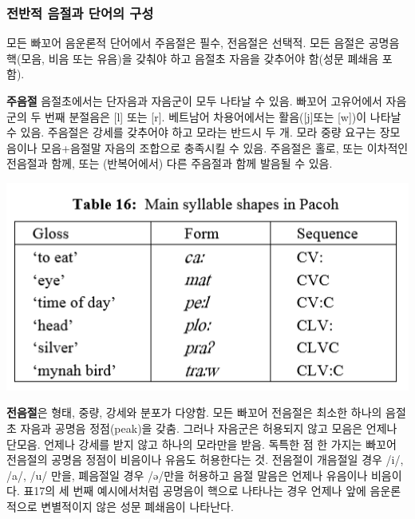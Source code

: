 \subsubsection{전반적 음절과 단어의 구성}
모든 빠꼬어 음운론적 단어에서 주음절은 필수, 전음절은 선택적. 모든 음절은 공명음 핵(모음, 비음 또는 유음)을 갖춰야 하고 음절초 자음을 갖추어야 함(성문 폐쇄음 포함).

\textbf{주음절} 음절초에서는 단자음과 자음군이 모두 나타날 수 있음. 빠꼬어 고유어에서 자음군의 두 번째 분절음은 [l] 또는 [r]. 베트남어 차용어에서는 활음([j]또는 [w])이 나타날 수 있음. 주음절은 강세를 갖추어야 하고 모라는 반드시 두 개. 모라 중량 요구는 장모음이나 모음+음절말 자음의 조합으로 충족시킬 수 있음. 주음절은 홀로, 또는 이차적인 전음절과 함께, 또는 (반복어에서) 다른 주음절과 함께 발음될 수 있음.

\begin{center}
\includegraphics{Pacoh/src/PacohTable16.png}
\end{center}

\textbf{전음절}은 형태, 중량, 강세와 분포가 다양함. 모든 빠꼬어 전음절은 최소한 하나의 음절초 자음과 공명음 정점(peak)을 갖춤. 그러나 자음군은 허용되지 않고 모음은 언제나 단모음. 언제나 강세를 받지 않고 하나의 모라만을 받음. 독특한 점 한 가지는 빠꼬어 전음절의 공명음 정점이 비음이나 유음도 허용한다는 것. 전음절이 개음절일 경우 /i/, /a/, /u/ 만을, 폐음절일 경우 /ə/만을 허용하고 음절 말음은 언제나 유음이나 비음이다.
표17의 세 번째 예시에서처럼 공명음이 핵으로 나타나는 경우 언제나 앞에 음운론적으로 변별적이지 않은 성문 폐쇄음이 나타난다.

